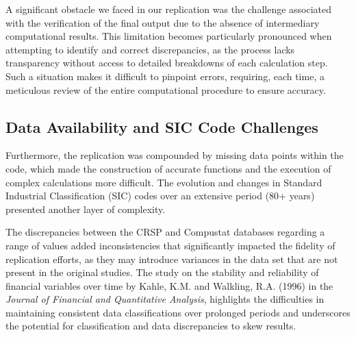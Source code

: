 \documentclass{article}
\begin{document}
A significant obstacle we faced in our replication was the challenge associated with the verification of the final output due to the absence of intermediary computational results. This limitation becomes particularly pronounced when attempting to identify and correct discrepancies, as the process lacks transparency without access to detailed breakdowns of each calculation step. Such a situation makes it difficult to pinpoint errors, requiring, each time, a meticulous review of the entire computational procedure to ensure accuracy.

\subsection*{Data Availability and SIC Code Challenges}

Furthermore, the replication was compounded by missing data points within the code, which made the construction of accurate functions and the execution of complex calculations more difficult. The evolution and changes in Standard Industrial Classification (SIC) codes over an extensive period (80+ years) presented another layer of complexity. 

The discrepancies between the CRSP and Compustat databases regarding a range of values added inconsistencies that significantly impacted the fidelity of replication efforts, as they may introduce variances in the data set that are not present in the original studies. The study on the stability and reliability of financial variables over time by Kahle, K.M. and Walkling, R.A. (1996) in the \textit{Journal of Financial and Quantitative Analysis}, highlights the difficulties in maintaining consistent data classifications over prolonged periods and underscores the potential for classification and data discrepancies to skew results.
\end{document}
